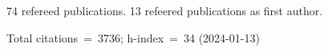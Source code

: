 74 refereed publications. 13 refeered publications as first author.

Total citations~=~3736; h-index~=~34 (2024-01-13)